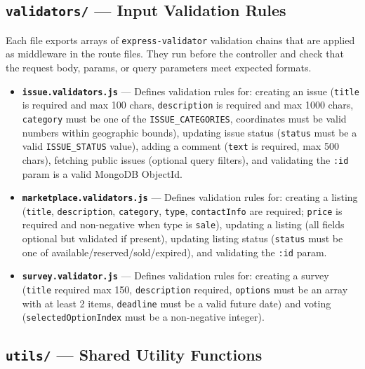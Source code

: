 \documentclass[12pt,a4paper]{article}
\begin{document}
\subsection{\texttt{validators/} --- Input Validation Rules}

Each file exports arrays of \texttt{express-validator} validation chains that are applied as middleware in the route files. They run before the controller and check that the request body, params, or query parameters meet expected formats.

\begin{itemize}[leftmargin=1cm]
  \item \textbf{\texttt{issue.validators.js}} --- Defines validation rules for: creating an issue (\texttt{title} is required and max 100 chars, \texttt{description} is required and max 1000 chars, \texttt{category} must be one of the \texttt{ISSUE\_CATEGORIES}, coordinates must be valid numbers within geographic bounds), updating issue status (\texttt{status} must be a valid \texttt{ISSUE\_STATUS} value), adding a comment (\texttt{text} is required, max 500 chars), fetching public issues (optional query filters), and validating the \texttt{:id} param is a valid MongoDB ObjectId.

  \item \textbf{\texttt{marketplace.validators.js}} --- Defines validation rules for: creating a listing (\texttt{title}, \texttt{description}, \texttt{category}, \texttt{type}, \texttt{contactInfo} are required; \texttt{price} is required and non-negative when type is \texttt{sale}), updating a listing (all fields optional but validated if present), updating listing status (\texttt{status} must be one of available/reserved/sold/expired), and validating the \texttt{:id} param.

  \item \textbf{\texttt{survey.validator.js}} --- Defines validation rules for: creating a survey (\texttt{title} required max 150, \texttt{description} required, \texttt{options} must be an array with at least 2 items, \texttt{deadline} must be a valid future date) and voting (\texttt{selectedOptionIndex} must be a non-negative integer).
\end{itemize}

\subsection{\texttt{utils/} --- Shared Utility Functions}
\end{document}
